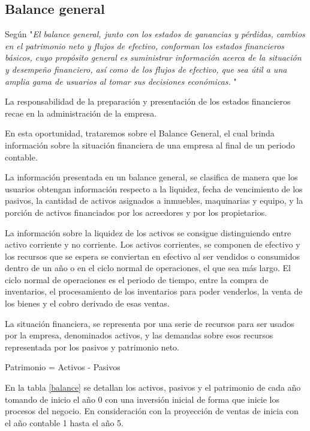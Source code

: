 \subsection{Balance general}

Según \textcite{balance_2022} "\textit{El balance general, junto con los estados de ganancias y pérdidas, cambios en el patrimonio neto y flujos de efectivo, conforman los estados financieros básicos, cuyo propósito general es suministrar información acerca de la situación y desempeño financiero, así como de los flujos de efectivo, que sea útil a una amplia gama de usuarios al tomar sus decisiones económicas.} "

La responsabilidad de la preparación y presentación de los estados financieros recae en la administración de la empresa.

En esta oportunidad, trataremos sobre el Balance General, el cual brinda información sobre la situación financiera de una empresa al final de un periodo contable.

La información presentada en un balance general, se clasifica de manera que los usuarios obtengan información respecto a la liquidez, fecha de vencimiento de los pasivos, la cantidad de activos asignados a inmuebles, maquinarias y equipo, y la porción de activos financiados por los acreedores y por los propietarios.

La información sobre la liquidez de los activos se consigue distinguiendo entre activo corriente y no corriente. Los activos corrientes, se componen de efectivo y los recursos que se espera se conviertan en efectivo al ser vendidos o consumidos dentro de un año o en el ciclo normal de operaciones, el que sea más largo. El ciclo normal de operaciones es el periodo de tiempo, entre la compra de inventarios, el procesamiento de los inventarios para poder venderlos, la venta de los bienes y el cobro derivado de esas ventas.

La situación financiera, se representa por una serie de recursos para ser usados por la empresa, denominados activos, y las demandas sobre esos recursos representada por los pasivos y patrimonio neto.

\centerline{Patrimonio = Activos - Pasivos}

En la tabla \ref{balance} se detallan los activos, pasivos y el patrimonio de cada año tomando de inicio el año 0 con una inversión inicial de forma que inicie los procesos del negocio. En consideración con la proyección de ventas de inicia con el año contable 1 hasta el año 5.

